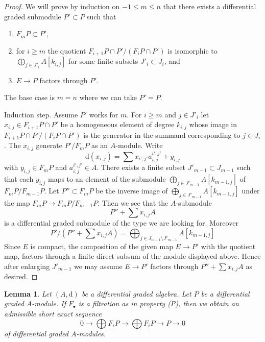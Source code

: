 \documentclass{amsart}
\theoremstyle{plain}
\newtheorem{lemma}[subsection]{Lemma}
\theoremstyle{definition}
\theoremstyle{remark}
\numberwithin{equation}{subsection}
\begin{document}
\begin{proof}
We will prove by induction on $-1 \leq m \leq n$ that there exists
a differential graded submodule $P' \subset P$  such that
\begin{enumerate}
\item $F_mP \subset P'$,
\item for $i \geq m$ the quotient $F_{i + 1}P \cap P'/(F_iP \cap P')$ is
isomorphic to $\bigoplus_{j \in J'_i} A[k_{i, j}]$ for some finite subsets
$J'_i \subset J_i$, and
\item $E \to P$ factors through $P'$.
\end{enumerate}
The base case is $m = n$ where we can take $P' = P$.

\medskip\noindent
Induction step. Assume $P'$ works for $m$.
For $i \geq m$ and $j \in J'_i$ let $x_{i, j} \in F_{i + 1}P \cap P'$
be a homogeneous element of degree $k_{i, j}$ whose image in
$F_{i + 1}P \cap P'/(F_iP \cap P')$ is the generator in
the summand corresponding to $j \in J_i$. The
$x_{i, j}$ generate $P'/F_mP$ as an $A$-module. Write
$$
\text{d}(x_{i, j}) = \sum x_{i', j'} a_{i, j}^{i', j'} + y_{i, j}
$$
with $y_{i, j} \in F_mP$ and $a_{i, j}^{i', j'} \in A$.
There exists a finite subset
$J'_{m - 1} \subset J_{m - 1}$ such that each $y_{i, j}$ maps to
an element of the submodule $\bigoplus_{j \in J'_{m - 1}} A[k_{m - 1, j}]$
of $F_mP/F_{m - 1}P$. Let $P'' \subset F_mP$ be the inverse
image of $\bigoplus_{j \in J'_{m - 1}} A[k_{m - 1, j}]$ under
the map $F_mP \to F_mP/F_{m - 1}P$. Then we see that the $A$-submodule
$$
P'' + \sum x_{i, j}A
$$
is a differential graded submodule of the type we are looking for. Moreover
$$
P'/(P'' + \sum x_{i, j}A) =
\bigoplus\nolimits_{j \in J_{m - 1} \setminus J'_{m - 1}} A[k_{m - 1, j}]
$$
Since $E$ is compact, the composition of the given map $E \to P'$
with the quotient map, factors through a finite direct subsum of
the module displayed above. Hence after enlarging $J'_{m - 1}$
we may assume $E \to P'$ factors through
$P'' + \sum x_{i, j}A$ as desired.
\end{proof}


\begin{lemma}
\label{lemma-property-P-sequence}
Let $(A, \text{d})$ be a differential graded algebra.
Let $P$ be a differential graded $A$-module. If $F_\bullet$
is a filtration as in property (P), then we obtain an
admissible short exact sequence
$$
0 \to
\bigoplus\nolimits F_iP \to
\bigoplus\nolimits F_iP \to P \to 0
$$
of differential graded $A$-modules.
\end{lemma}
\end{document}
